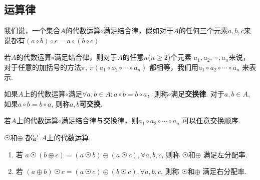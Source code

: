 \subsection{运算律} %

\begin{Definition}[结合率]
我们说，一个集合$A$的代数运算$\circ$满足结合律，假如对于$A$的任何三个元素$a, b, c$来说都有$
(a \circ b) \circ c = a \circ (b \circ c)
$
\end{Definition}


\begin{Theorem}
若$A$的代数运算$\circ$满足结合律，则对于$A$的任意$n$($n \ge 2$)个元素 $a_1, a_2, \cdots, a_n$来说，对于任意的加括号的方法$\pi$, $\pi(a_1 \circ a_2 \circ \cdots \circ a_n)$ 都相等，我们用$a_1 \circ a_2 \circ \cdots \circ a_n$ 来表示.
\end{Theorem}

\begin{Definition}[交换律]
如果$A$上的代数运算$\circ$满足$\forall a, b \in A: a \circ b = b \circ a$，则称$\circ$满足\textbf{交换律}. 对于$a, b \in A$, 如果$a \circ b = b \circ a$, 则称$a, b$\textbf{可交换}.
\end{Definition}

\begin{Theorem}
若$A$上的代数运算$\circ$满足结合律与交换律，则$a_1 \circ a_2 \circ \cdots \circ a_n$ 可以任意交换顺序.
\end{Theorem}

\begin{Definition}[分配率]
$ \astrosun $和$ \oplus $ 都是 $A$上的代数运算, 
\begin{enumerate}[(1)]
\item 若
$ a \, \astrosun \, (b \oplus c) = (a \, \astrosun \, b) \oplus (a \, \astrosun \, c), \forall a, b, c $, 则称 $ \astrosun$和$ \oplus $  满足左分配率.
\item 若
$ (a \oplus b) \, \astrosun \, c = (a \, \astrosun \, c) \oplus ( b \, \astrosun \, c), \forall a, b, c$, 则称 $ \astrosun$和$\oplus $  满足右分配率.
\end{enumerate}
\end{Definition}

